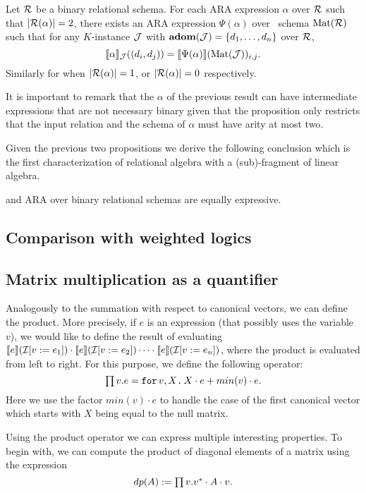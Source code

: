 \begin{proposition}
	Let $\mathcal{R}$ be a binary relational schema. For each ARA expression $\alpha$ over $\mathcal{R}$  such that $|\mathcal{R}(\alpha)| = 2$, there exists an ARA expression $\Psi(\alpha)$ over \lang \ schema $\text{Mat}(\mathcal{R})$ such that for any $K$-instance $\mathcal{J}$ with $\mathbf{adom}(\mathcal{J}) = \{d_1, \ldots, d_n\}$ over $\mathcal{R}$,
	$$
	\llbracket \alpha \rrbracket_{\mathcal{J}}((d_i, d_j))=\llbracket \Psi(\alpha) \rrbracket(\text{Mat}(\mathcal{J}))_{i,j}.
	$$
	Similarly for when $|\mathcal{R}(\alpha)| = 1$, or $|\mathcal{R}(\alpha)| = 0$ respectively.
\end{proposition} 

It is important to remark that the $\alpha$ of the previous result can have intermediate expressions that are not necessary binary given that the proposition only restricts that the input relation and the schema of $\alpha$ must have arity at most two. 

Given the previous two propositions we derive the following conclusion which is the first characterization of relational algebra with a (sub)-fragment of linear algebra.
\begin{corollary}
	\langsum and ARA over binary relational schemas are equally expressive. 
\end{corollary}


\subsection{Comparison with weighted logics}




\subsection{Matrix multiplication as a quantifier}

Analogously to the summation with respect to canonical vectors, we can define the product. More precisely, 
if $e$ is an \langfor expression (that possibly uses the variable $v$), we would like to define the result of evaluating $\llbracket e \rrbracket(\mathcal{I}[v := e_1]) \cdot \llbracket e \rrbracket(\mathcal{I}[v := e_2])\cdots \cdot \llbracket e \rrbracket(\mathcal{I}[v := e_n])$, where the product is evaluated from left to right. For this purpose, we define the following operator:
$$\textstyle\prod v. e=\texttt{for}\, v,X \texttt{.}\, X\cdot e + min(v)\cdot e.$$
Here we use the factor $min(v)\cdot e$ to handle the case of the first canonical vector which starts with $X$ being equal to the null matrix. 

Using the product operator we can express multiple interesting properties. To begin with, we can compute the product of diagonal elements of a matrix using the expression $$dp(A) := \textstyle\prod v. v^*\cdot A \cdot v.$$

